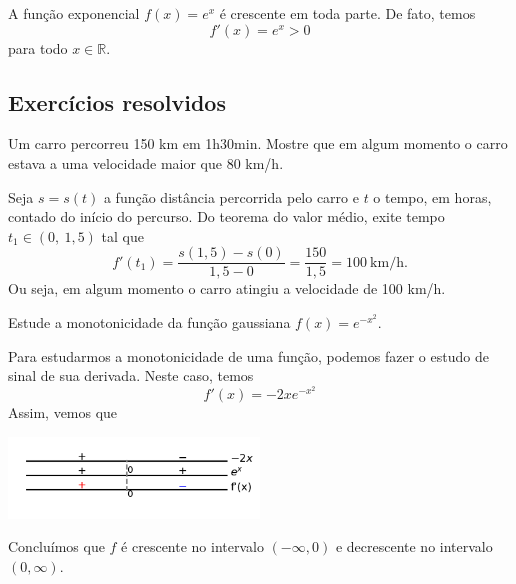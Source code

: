 \cleardoublepage\documentclass[../main.tex]{subfiles}
\begin{document}
\begin{ex}
  A função exponencial $f(x) = e^x$ é crescente em toda parte. De fato, temos
  \begin{equation*}
    f'(x) = e^x > 0
  \end{equation*}
  para todo $x\in\mathbb{R}$.
\end{ex}

\subsection{Exercícios resolvidos}

\begin{exeresol}
  Um carro percorreu 150 km em 1h30min. Mostre que em algum momento o carro estava a uma velocidade maior que 80 km/h.
\end{exeresol}
\begin{resol}
  Seja $s=s(t)$ a função distância percorrida pelo carro e $t$ o tempo, em horas, contado do início do percurso. Do teorema do valor médio, exite tempo $t_1\in (0,~1,5)$ tal que
  \begin{equation*}
    f'(t_1) = \frac{s(1,5)-s(0)}{1,5-0} = \frac{150}{1,5} = 100~\text{km/h}.
  \end{equation*}
  Ou seja, em algum momento o carro atingiu a velocidade de 100 km/h.
\end{resol}

\begin{exeresol}
  Estude a monotonicidade da função gaussiana $f(x) = e^{-x^2}$.  
\end{exeresol}
\begin{resol}
  Para estudarmos a monotonicidade de uma função, podemos fazer o estudo de sinal de sua derivada. Neste caso, temos
  \begin{equation*}
    f'(x) = -2xe^{-x^2}
  \end{equation*}
  Assim, vemos que
  \begin{center}
    \includegraphics[width=0.5\textwidth]{./fig_apl_deriv/fig_exeresol_gauss_estsinal}
  \end{center}
  Concluímos que $f$ é crescente no intervalo $(-\infty, 0)$ e decrescente no intervalo $(0, \infty)$.
\end{resol}
\end{document}
